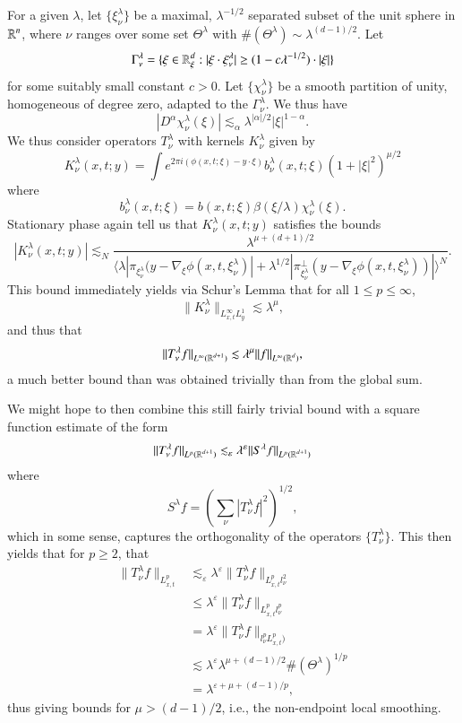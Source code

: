 For a given $\lambda$, let $\{ \xi_\nu^\lambda \}$ be a maximal, $\lambda^{-1/2}$ separated subset of the unit sphere in $\operatorname{\mathbb{R}}^n$, where $\nu$ ranges over some set $\Theta^\lambda$ with $\#(\Theta^\lambda) \sim \lambda^{(d-1)/2}$. Let
%
\[ \Gamma^\lambda_\nu = \{ \xi \in \operatorname{\mathbb{R}}^d_\xi : |\xi \cdot \xi^\lambda_\nu| \geq (1 - c \lambda^{-1/2}) \cdot |\xi| \} \]
%
for some suitably small constant $c > 0$. Let $\{ \chi^\lambda_\nu \}$ be a smooth partition of unity, homogeneous of degree zero, adapted to the $\Gamma^\lambda_\nu$. We thus have
%
\[ |D^\alpha \chi^\lambda_\nu(\xi)| \lesssim_\alpha \lambda^{|\alpha|/2} |\xi|^{1 - \alpha}. \]
%
We thus consider operators $T^\lambda_\nu$ with kernels $K^\lambda_\nu$ given by
%
\[ K^\lambda_\nu(x,t;y) = \int e^{2 \pi i (\phi(x,t;\xi) - y \cdot \xi)} b^\lambda_\nu(x,t;\xi) ( 1 + |\xi|^2 )^{\mu/2} \]
%
where
%
\[ b^\lambda_\nu(x,t;\xi) = b(x,t;\xi) \beta(\xi / \lambda) \chi^\lambda_\nu(\xi). \]
%
Stationary phase again tell us that $K^\lambda_\nu(x,t;y)$ satisfies the bounds
%
\[ |K^\lambda_\nu(x,t;y)| \lesssim_N \frac{\lambda^{\mu + (d+1)/2}}{\langle \lambda | \pi_{\xi^\lambda_\nu} (y - \nabla_\xi \phi(x,t,\xi^\lambda_\nu)| + \lambda^{1/2} | \pi_{\xi^\lambda_\nu}^\perp (y - \nabla_\xi \phi(x,t,\xi^\lambda_\nu)) | \rangle^N}. \]
%
This bound immediately yields via Schur's Lemma that for all $1 \leq p \leq \infty$,
%
\[ \| K^\lambda_\nu \|_{L^\infty_{x,t} L^1_y} \lesssim \lambda^\mu, \]
%
and thus that
%
\[ \| T^\lambda_\nu f \|_{L^\infty(\operatorname{\mathbb{R}}^{d+1})} \lesssim \lambda^\mu \| f \|_{L^\infty(\operatorname{\mathbb{R}}^d)}, \]
%
a much better bound than was obtained trivially than from the global sum.

We might hope to then combine this still fairly trivial bound with a square function estimate of the form
%
\[ \| T^\lambda_\nu f \|_{L^p(\operatorname{\mathbb{R}}^{d+1})} \lesssim_\varepsilon \lambda^\varepsilon \| S^\lambda f \|_{L^p(\operatorname{\mathbb{R}}^{d+1})} \]
%
where
%
\[ S^\lambda f = \left( \sum_\nu | T^\lambda_\nu f |^2 \right)^{1/2}, \]
%
which in some sense, captures the orthogonality of the operators $\{ T^\lambda_\nu \}$. This then yields that for $p \geq 2$, that
%
\begin{align*}
    \| T^\lambda_\nu f \|_{L^p_{x,t}} &\lesssim_\varepsilon \lambda^\varepsilon \| T^\lambda_\nu f \|_{L^p_{x,t} l^2_\nu}\\
    &\leq \lambda^\varepsilon \| T^\lambda_\nu f \|_{L^p_{x,t} l^p_\nu}\\
    &= \lambda^\varepsilon \| T^\lambda_\nu f \|_{l^p_\nu L^p_{x,t})}\\
    &\lesssim \lambda^\varepsilon \lambda^{\mu + (d-1)/2} \#(\Theta^\lambda)^{1/p}\\
    &= \lambda^{\varepsilon + \mu + (d-1) / p},
\end{align*}
%
thus giving bounds for $\mu > (d-1)/2$, i.e., the non-endpoint local smoothing.

